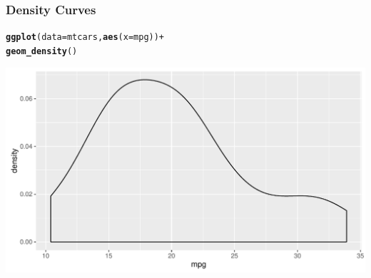 \documentclass[12pt]{beamer}\usepackage[]{graphicx}\usepackage[]{color}
\makeatletter
\newcommand{\hlopt}[1]{\textcolor[rgb]{0,0,0}{#1}}%
\newcommand{\hlstd}[1]{\textcolor[rgb]{0.345,0.345,0.345}{#1}}%
\newcommand{\hlkwc}[1]{\textcolor[rgb]{0.333,0.667,0.333}{#1}}%
\newcommand{\hlkwd}[1]{\textcolor[rgb]{0.737,0.353,0.396}{\textbf{#1}}}%
\newenvironment{kframe}{%
 \def\at@end@of@kframe{}%
 \ifinner\ifhmode%
  \def\at@end@of@kframe{\end{minipage}}%
  \begin{minipage}{\columnwidth}%
 \fi\fi%
 \def\FrameCommand##1{\hskip\@totalleftmargin \hskip-\fboxsep
 \colorbox{shadecolor}{##1}\hskip-\fboxsep
     \hskip-\linewidth \hskip-\@totalleftmargin \hskip\columnwidth}%
 \MakeFramed {\advance\hsize-\width
   \@totalleftmargin\z@ \linewidth\hsize
   \@setminipage}}%
 {\par\unskip\endMakeFramed%
 \at@end@of@kframe}
\newenvironment{knitrout}{}{} %
\makeatother
\begin{document}
\begin{frame}[fragile]
\frametitle{Density Curves}

\begin{knitrout}\scriptsize
{}\color{fgcolor}\begin{kframe}
\begin{alltt}
\hlkwd{ggplot}\hlstd{(}\hlkwc{data} \hlstd{= mtcars,} \hlkwd{aes}\hlstd{(}\hlkwc{x} \hlstd{= mpg))} \hlopt{+}
  \hlkwd{geom_density}\hlstd{()}
\end{alltt}
\end{kframe}

{\centering \includegraphics[width=.9\linewidth,height=.5\linewidth]{figure/unnamed-chunk-20-1} 

}



\end{knitrout}

\end{frame}

\end{document}
